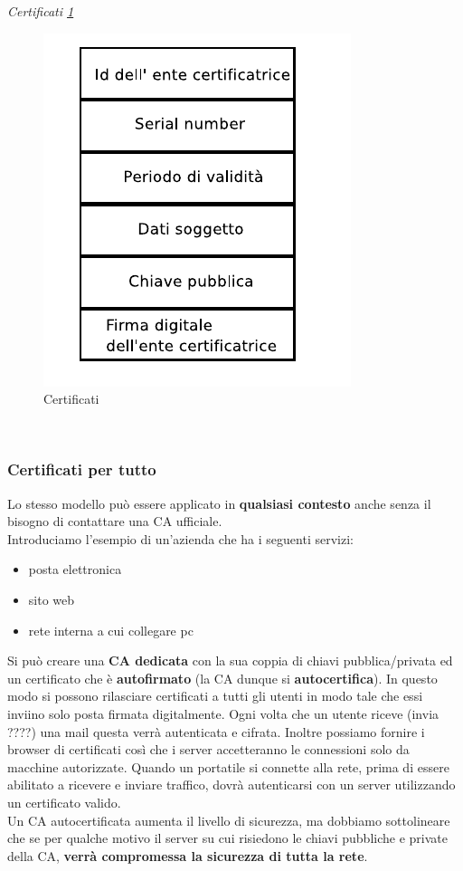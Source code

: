 \documentclass[12pt]{article}
\begin{document}
			\textit{Certificati \ref{fig:17}}\\
			\begin{figure}[h!]
				\centering
				\includegraphics[scale=0.60]{img/certificati.PNG}
				\caption{Certificati \label{fig:17}}
			\end{figure}\\
					
			\subsubsection{Certificati per tutto}
				Lo stesso modello può essere applicato in \textbf{qualsiasi contesto} anche senza il bisogno di contattare una CA ufficiale.\\
				Introduciamo l'esempio di un'azienda che ha i seguenti servizi:
				\begin{itemize}
					\item posta elettronica
					\item sito web
					\item rete interna a cui collegare pc
				\end{itemize}
				Si può creare una \textbf{CA dedicata} con la sua coppia di 
				chiavi pubblica/privata ed un certificato che è \textbf{autofirmato} (la CA dunque si \textbf{autocertifica}). In questo modo si possono rilasciare certificati a tutti gli utenti in modo tale che essi inviino solo posta firmata digitalmente. Ogni volta che un utente riceve (invia ????) una mail questa verrà autenticata e cifrata. Inoltre possiamo fornire i browser di certificati così che i server accetteranno le connessioni solo da macchine autorizzate. Quando un portatile si connette alla rete, prima di essere abilitato a ricevere e inviare traffico, dovrà autenticarsi con un server utilizzando un certificato valido.\\
				Un CA autocertificata aumenta il livello di sicurezza, ma dobbiamo sottolineare che se per qualche motivo il server su cui risiedono le chiavi pubbliche e private della CA, \textbf{verrà compromessa la sicurezza di tutta la rete}.
\end{document}
